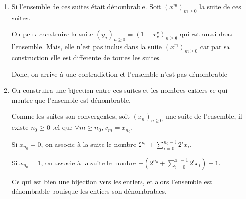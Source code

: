 \documentclass[10pt,a4paper,oneside]{article}
\newenvironment{solution}[1][Solution]{\begin{trivlist}
\item[\hskip \labelsep {\bfseries #1}]}{\end{trivlist}}
\begin{document}
\begin{solution}
\begin{enumerate}
\item
Si l'ensemble de ces suites était dénombrable. Soit $(x^m)_{m \geq 0}$ la suite de ces suites.

On peux construire la suite $(y_n)_{n \geq 0} = (1 - x^n_n)_{n \geq 0}$ qui est aussi dans l'ensemble. Mais, elle n'est pas inclus dans la suite $(x^m)_{m \geq 0}$ car par sa construction elle est differente de toutes les suites.

Donc, on arrive à une contradiction et l'ensemble n'est pas dénombrable.

\item
On construira une bijection entre ces suites et les nombres entiers ce qui montre que l'ensemble est dénombrable.

Comme les suites son convergentes, soit $(x_n)_{n \geq 0}$ une suite de l'ensemble, il existe $n_0 \geq 0$ tel que $\forall m \geq n_0, x_m = x_{n_0}$.

Si $x_{n_0} = 0$, on associe à la suite le nombre $2^{n_0} + \sum_{i = 0}^{n_0 - 1} 2^i x_i$.

Si $x_{n_0} = 1$, on associe à la suite le nombre $-(2^{n_0} + \sum_{i = 0}^{n_0 - 1} 2^i x_i) + 1$.

Ce qui est bien une bijection vers les entiers, et alors l'ensemble est dénombrable pouisque les entiers son dénombrables.
\end{enumerate}
\end{solution}
\end{document}

